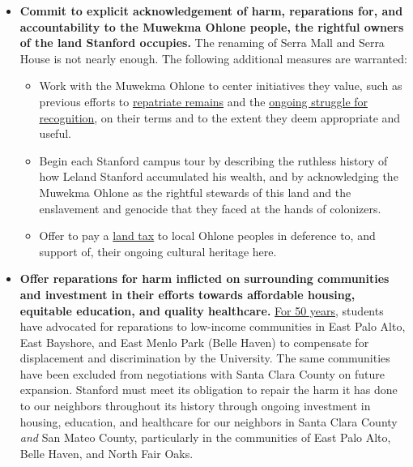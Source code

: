 \documentclass[12pt, titlepage, letterpaper]{article}
\begin{document}
\begin{itemize}[itemsep=1em]
    \item \textbf{Commit to explicit acknowledgement of harm, reparations for, and accountability to the Muwekma Ohlone people, the rightful owners of the land Stanford occupies.} The renaming of Serra Mall and Serra House is not nearly enough. The following additional measures are warranted:
    \begin{itemize}
        \item Work with the Muwekma Ohlone to center initiatives they value, such as previous efforts to \href{https://news.stanford.edu/2019/11/06/stanford-prepares-rename-jane-stanford-way-honors-relationship-muwekma-ohlone/}{repatriate remains} and the \href{http://www.muwekma.org/tribalhistory/recognitionprocess.html}{ongoing struggle for recognition}, on their terms and to the extent they deem appropriate and useful.
        \item Begin each Stanford campus tour by describing the ruthless history of how Leland Stanford accumulated his wealth, and by acknowledging the Muwekma Ohlone as the rightful stewards of this land and the enslavement and genocide that they faced at the hands of colonizers.
        \item Offer to pay a \href{https://sogoreate-landtrust.com/shuumi-land-tax/}{land tax} to local Ohlone peoples in deference to, and support of, their ongoing cultural heritage here.
    \end{itemize}

    \item \textbf{Offer reparations for harm inflicted on surrounding communities and investment in their efforts towards affordable housing, equitable education, and quality healthcare.} \href{https://bcsc.stanford.edu/sites/g/files/sbiybj10366/f/justice_and_hope-_scanned.pdf}{For 50 years}, students have advocated for reparations to low-income communities in East Palo Alto, East Bayshore, and East Menlo Park (Belle Haven) to compensate for displacement and discrimination by the University. The same communities have been excluded from negotiations with Santa Clara County on future expansion. Stanford must meet its obligation to repair the harm it has done to our neighbors throughout its history through ongoing investment in housing, education, and healthcare for our neighbors in Santa Clara County \textit{and} San Mateo County, particularly in the communities of East Palo Alto, Belle Haven, and North Fair Oaks.
    

\end{itemize}
\end{document}
